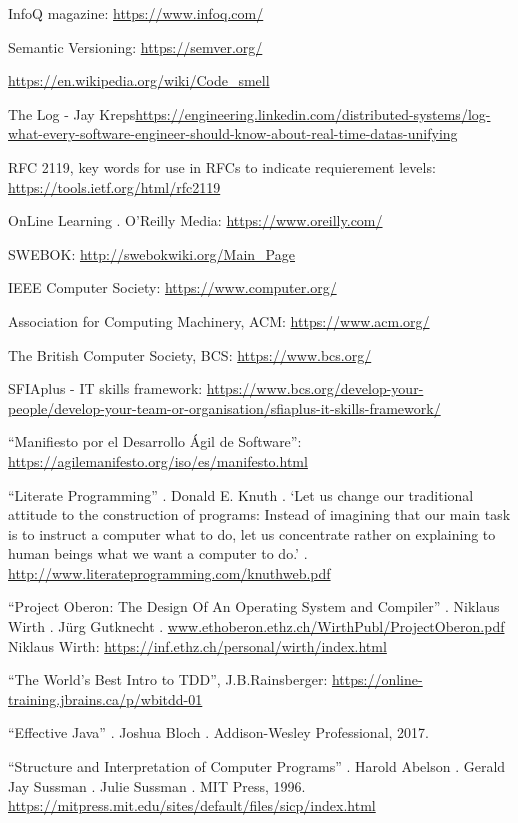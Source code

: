 \documentclass[spanish,12pt,a4paper,final,oneside]{book}
\begin{document}
InfoQ magazine: \url{https://www.infoq.com/}

Semantic Versioning: \url{https://semver.org/}

\url{https://en.wikipedia.org/wiki/Code_smell}

The Log - Jay Kreps\url{https://engineering.linkedin.com/distributed-systems/log-what-every-software-engineer-should-know-about-real-time-datas-unifying}

RFC 2119, key words for use in RFCs to indicate requierement levels: 
\\ \url{https://tools.ietf.org/html/rfc2119}

OnLine Learning . O’Reilly Media: \url{https://www.oreilly.com/}

SWEBOK:  \url{http://swebokwiki.org/Main_Page}

IEEE Computer Society:  \url{https://www.computer.org/}

Association for Computing Machinery, ACM:  \url{https://www.acm.org/}

The British Computer Society, BCS: \url{https://www.bcs.org/}

SFIAplus - IT skills framework: \url{https://www.bcs.org/develop-your-people/develop-your-team-or-organisation/sfiaplus-it-skills-framework/}

``Manifiesto por el Desarrollo Ágil de Software'': \url{https://agilemanifesto.org/iso/es/manifesto.html}

``Literate Programming'' . Donald E. Knuth . ‘Let us change our traditional attitude to the construction of programs: Instead of imagining that our main task is to instruct a computer what to do, let us concentrate rather on explaining to human beings what we want a computer to do.’ . \url{http://www.literateprogramming.com/knuthweb.pdf}

``Project Oberon: The Design Of An Operating System and Compiler'' . Niklaus Wirth . Jürg Gutknecht . \url{www.ethoberon.ethz.ch/WirthPubl/ProjectOberon.pdf}
Niklaus Wirth: \url{https://inf.ethz.ch/personal/wirth/index.html}

``The World’s Best Intro to TDD'', J.B.Rainsberger: \url{https://online-training.jbrains.ca/p/wbitdd-01}

``Effective Java'' . Joshua Bloch . Addison-Wesley Professional, 2017.

``Structure and Interpretation of Computer Programs'' . Harold Abelson . Gerald Jay Sussman . Julie Sussman . MIT Press, 1996.
\url{https://mitpress.mit.edu/sites/default/files/sicp/index.html}
\end{document}
